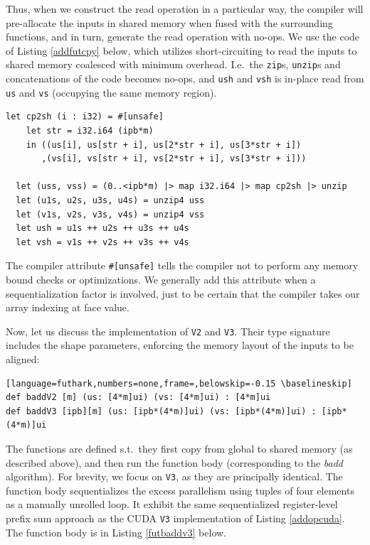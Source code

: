 Thus, when we construct the read operation in a particular way, the compiler
will pre-allocate the inputs in shared memory when fused with the surrounding
functions, and in turn, generate the read operation with no-ops. We use the code
of Listing \ref{addfutcpy} below, which utilizes short-circuiting to read the
inputs to shared memory coalesced with minimum overhead. I.e.\ the
\texttt{zip}s, \texttt{unzip}s and concatenations of the code becomes no-ops,
and \texttt{ush} and \texttt{vsh} is in-place read from \texttt{us} and
\texttt{vs} (occupying the same memory region).

\begin{lstlisting}[language=futhark,caption={\footnotesize Futhark code snippet reading
\texttt{us} and \texttt{vs} of size $\mathtt{ipb}\cdot \mathtt{m}$ from global to shared memory coalesced utilizing array short-circuiting (from file \texttt{add.fut} slightly
edited).},label={addfutcpy},gobble=2]
  let cp2sh (i : i32) = #[unsafe]
    let str = i32.i64 (ipb*m)
    in ((us[i], us[str + i], us[2*str + i], us[3*str + i])
       ,(vs[i], vs[str + i], vs[2*str + i], vs[3*str + i]))

  let (uss, vss) = (0..<ipb*m) |> map i32.i64 |> map cp2sh |> unzip
  let (u1s, u2s, u3s, u4s) = unzip4 uss
  let (v1s, v2s, v3s, v4s) = unzip4 vss
  let ush = u1s ++ u2s ++ u3s ++ u4s
  let vsh = v1s ++ v2s ++ v3s ++ v4s
\end{lstlisting}

The compiler attribute \texttt{\#[unsafe]} tells the compiler not to perform any
memory bound checks or optimizations. We generally add this attribute when a
sequentialization factor is involved, just to be certain that the compiler takes
our array indexing at face value.

Now, let us discuss the implementation of \texttt{V2} and \texttt{V3}. Their
type signature includes the shape parameters, enforcing the memory layout of the
inputs to be aligned:
\begin{lstlisting}[language=futhark,numbers=none,frame=,belowskip=-0.15 \baselineskip]
def baddV2 [m] (us: [4*m]ui) (vs: [4*m]ui) : [4*m]ui
def baddV3 [ipb][m] (us: [ipb*(4*m)]ui) (vs: [ipb*(4*m)]ui) : [ipb*(4*m)]ui
\end{lstlisting}
The functions are defined s.t.\ they first copy from global to shared memory (as
described above), and then run the function body (corresponding to the
\textit{badd} algorithm). For brevity, we focus on \texttt{V3}, as they are
principally identical. The function body sequentializes the excess parallelism
using tuples of four elements as a manually unrolled loop. It exhibit the same
sequentialized register-level prefix sum approach as the CUDA \texttt{V3}
implementation of Listing \ref{addopcuda}. The function body is in Listing
\ref{futbaddv3} below.

